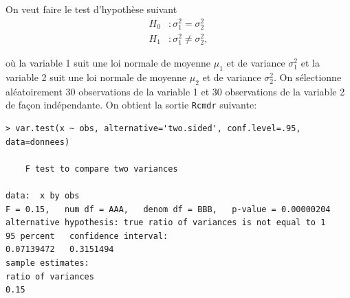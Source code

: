 \begin{questions}
\begin{parts}
\end{parts}

\newpage

\question\label{test2variances}

On veut faire le test d'hypothèse suivant 
\begin{align*}
H_0 &:\sigma_1^2 = \sigma_2^2\\
H_1 &:\sigma_1^2 \neq \sigma_2^2,
\end{align*}

où la variable 1 suit une loi normale de moyenne $\mu_1$ et de variance $\sigma_1^2$ et la variable 2 suit une loi normale de moyenne $\mu_2$ et de variance $\sigma_2^2$. On sélectionne aléatoirement 30 observations de la variable 1 et 30 observations de la variable 2 de façon indépendante. On obtient la sortie \texttt{Rcmdr} suivante:

\begin{verbatim}
> var.test(x ~ obs, alternative='two.sided', conf.level=.95, data=donnees)

	F test to compare two variances

data:  x by obs
F = 0.15,   num df = AAA,   denom df = BBB,   p-value = 0.00000204
alternative hypothesis: true ratio of variances is not equal to 1
95 percent   confidence interval:
0.07139472   0.3151494
sample estimates:
ratio of variances 
0.15
\end{verbatim}

\end{questions}
